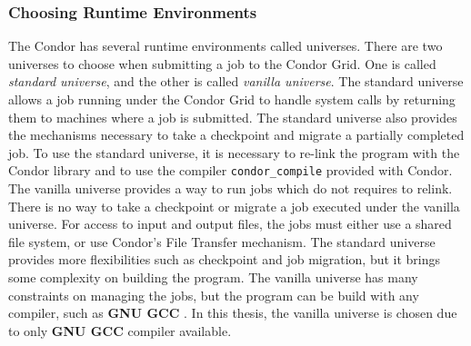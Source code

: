\subsubsection{Choosing Runtime Environments} The Condor has several runtime environments called universes. There are two universes to choose when submitting a job to the Condor Grid. One is called \textit{standard universe}, and the other is called \textit{vanilla universe}. The standard universe allows a job running under the Condor Grid to handle system calls by returning them to machines where a job is submitted. The standard universe also provides the mechanisms necessary to take a checkpoint and migrate a partially completed job. To use the standard universe, it is necessary to re-link the program with the Condor library and to use the compiler \verb|condor_compile| provided with Condor. The vanilla universe provides a way to run jobs which do not requires to relink. There is no way to take a checkpoint or migrate a job executed under the vanilla universe. For access to input and output files, the jobs must either use a shared file system, or use Condor's File Transfer mechanism. The standard universe provides more flexibilities such as checkpoint and job migration, but it brings some complexity on building the program. The vanilla universe has many constraints on managing the jobs, but the program can be build with any compiler, such as \textbf{GNU GCC} \cite{Gough2004}. In this thesis, the vanilla universe is chosen due to only \textbf{GNU GCC} compiler available.

